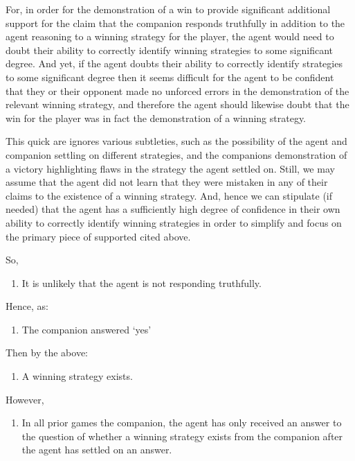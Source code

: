 \documentclass[10pt]{article}
\newcommand{\hozline}[0]{%
  \noindent\hdashrule[0.5ex][c]{\textwidth}{.1pt}{}
}
\begin{document}
For, in order for the demonstration of a win to provide significant additional support for the claim that the companion responds truthfully in addition to the agent reasoning to a winning strategy for the player, the agent would need to doubt their ability to correctly identify winning strategies to some significant degree.
And yet, if the agent doubts their ability to correctly identify strategies to some significant degree then it seems difficult for the agent to be confident that they or their opponent made no unforced errors in the demonstration of the relevant winning strategy, and therefore the agent should likewise doubt that the win for the player was in fact the demonstration of a winning strategy.

This quick are ignores various subtleties, such as the possibility of the agent and companion settling on different strategies, and the companions demonstration of a victory highlighting flaws in the strategy the agent settled on.
Still, we may assume that the agent did not learn that they were mistaken in any of their claims to the existence of a winning strategy.
And, hence we can stipulate (if needed) that the agent has a sufficiently high degree of confidence in their own ability to correctly identify winning strategies in order to simplify and focus on the primary piece of supported cited above.

\hozline

So,

\begin{enumerate}[label=(C\arabic*)]
\item It is unlikely that the agent is not responding truthfully.
\end{enumerate}

Hence, as:

\begin{enumerate}[label=(C\arabic*)]
\item The companion answered `yes'
\end{enumerate}

Then by the above:

\begin{enumerate}[label=(C\arabic*)]
\item A winning strategy exists.
\end{enumerate}

However,

\begin{enumerate}
\item In all prior games the companion, the agent has only received an answer to the question of whether a winning strategy exists from the companion after the agent has settled on an answer.
\end{enumerate}
\end{document}
